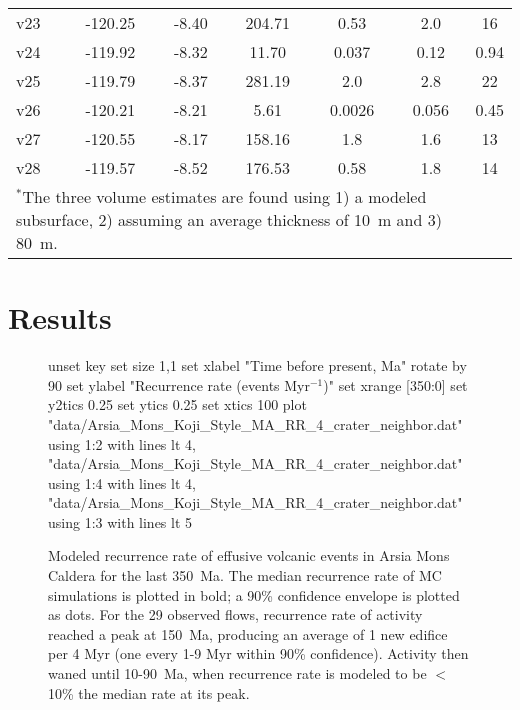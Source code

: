 \begin{table}[h!]
\begin{tabular}{l c c c c c c}
			v23 & -120.25 & -8.40 & 204.71 & 0.53 & 2.0 & 16\\
			v24 & -119.92 & -8.32 & 11.70 & 0.037 & 0.12 & 0.94\\
			v25 & -119.79 & -8.37 & 281.19 & 2.0 & 2.8 & 22\\
			v26 & -120.21 & -8.21 & 5.61 & 0.0026 & 0.056 & 0.45\\
			v27 & -120.55 & -8.17 & 158.16 & 1.8 & 1.6 & 13\\
			v28 & -119.57 & -8.52 & 176.53 & 0.58 & 1.8 & 14\\
		\bottomrule
		\multicolumn{6}{p{0.65\linewidth}}{$^*$The three volume estimates are found using 1) a modeled subsurface, 2) assuming an average thickness of 10~m and 3) 80~m.}
	\end{tabular}
	\label{tab_morphdatabase}
	\end{table}

\section{Results}

	\begin{figure}[h!]
		\centering
		\begin{gnuplot}[terminal=latex, terminaloptions=rotate]
			unset key
			set size 1,1
			set xlabel "Time before present, Ma" rotate by 90
			set ylabel "Recurrence rate (events Myr$^{-1}$)"
			set xrange [350:0]
			set y2tics 0.25
			set ytics 0.25
			set xtics 100
			plot "data/Arsia_Mons_Koji_Style_MA_RR_4_crater_neighbor.dat" using 1:2 with lines lt 4, "data/Arsia_Mons_Koji_Style_MA_RR_4_crater_neighbor.dat" using 1:4 with lines lt 4, "data/Arsia_Mons_Koji_Style_MA_RR_4_crater_neighbor.dat" using 1:3 with lines lt 5
		\end{gnuplot}
		\caption[Modeled recurrence rate of effusive volcanic events in Arsia Mons Caldera for the last 350~Ma.]{Modeled recurrence rate of effusive volcanic events in Arsia Mons Caldera for the last 350~Ma. The median recurrence rate of MC simulations is plotted in bold; a 90\% confidence envelope is plotted as dots. For the 29 observed flows, recurrence rate of activity reached a peak at 150~Ma, producing an average of 1 new edifice per 4 Myr (one every 1-9 Myr within 90\% confidence). Activity then waned until 10-90~Ma, when recurrence rate is modeled to be $<$10\% the median rate at its peak.}
		\label{fig_VERRMRR}
	\end{figure}
	

